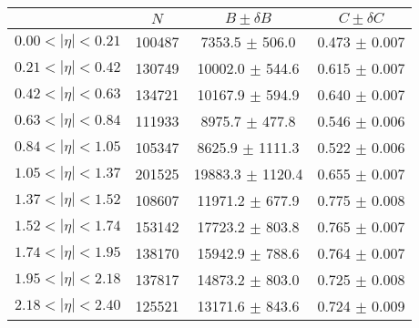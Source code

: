 \begin{tabular}{lccc}
\hline
    &   $N$   & $B \pm \delta B$  &  $C \pm \delta C$ \\
\hline
$0.00 < |\eta| <0.21$          & 100487     & 7353.5     $\pm$ 506.0 & 0.473      $\pm$ 0.007 \\
$0.21 < |\eta| <0.42$          & 130749     & 10002.0    $\pm$ 544.6 & 0.615      $\pm$ 0.007 \\
$0.42 < |\eta| <0.63$          & 134721     & 10167.9    $\pm$ 594.9 & 0.640      $\pm$ 0.007 \\
$0.63 < |\eta| <0.84$          & 111933     & 8975.7     $\pm$ 477.8 & 0.546      $\pm$ 0.006 \\
$0.84 < |\eta| <1.05$          & 105347     & 8625.9     $\pm$ 1111.3 & 0.522      $\pm$ 0.006 \\
$1.05 < |\eta| <1.37$          & 201525     & 19883.3    $\pm$ 1120.4 & 0.655      $\pm$ 0.007 \\
$1.37 < |\eta| <1.52$          & 108607     & 11971.2    $\pm$ 677.9 & 0.775      $\pm$ 0.008 \\
$1.52 < |\eta| <1.74$          & 153142     & 17723.2    $\pm$ 803.8 & 0.765      $\pm$ 0.007 \\
$1.74 < |\eta| <1.95$          & 138170     & 15942.9    $\pm$ 788.6 & 0.764      $\pm$ 0.007 \\
$1.95 < |\eta| <2.18$          & 137817     & 14873.2    $\pm$ 803.0 & 0.725      $\pm$ 0.008 \\
$2.18 < |\eta| <2.40$          & 125521     & 13171.6    $\pm$ 843.6 & 0.724      $\pm$ 0.009 \\
\hline
\end{tabular}

